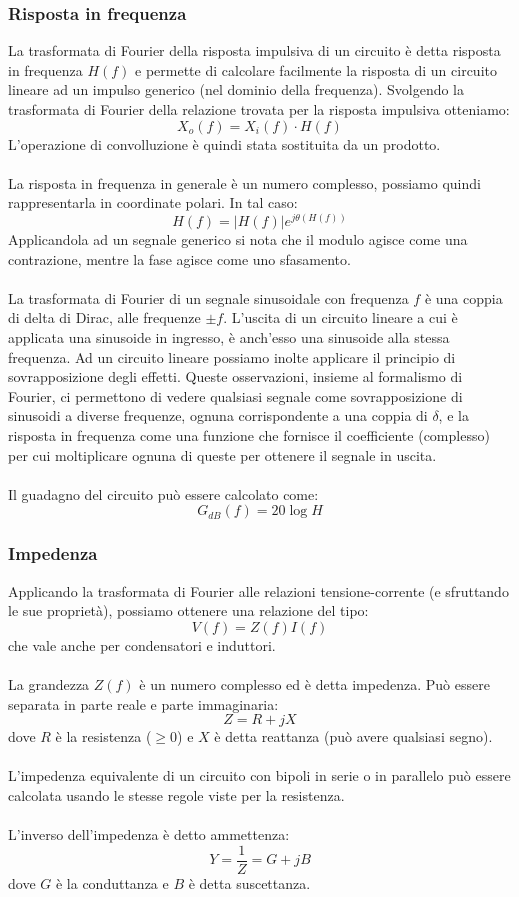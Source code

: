 \documentclass{article}
\begin{document}
\subsubsection{Risposta in frequenza}
La trasformata di Fourier della risposta impulsiva di un circuito è detta risposta in frequenza $H(f)$ e permette di calcolare facilmente la risposta di un circuito lineare ad un impulso generico (nel dominio della frequenza). Svolgendo la trasformata di Fourier della relazione trovata per la risposta impulsiva otteniamo:
$$ X_o(f) = X_i(f)\cdot H(f) $$
L'operazione di convolluzione è quindi stata sostituita da un prodotto.\\\\
La risposta in frequenza in generale è un numero complesso, possiamo quindi rappresentarla in coordinate polari. In tal caso:
$$ H(f) = |H(f)|e^{j\theta(H(f))} $$
Applicandola ad un segnale generico si nota che il modulo agisce come una contrazione, mentre la fase agisce come uno sfasamento.\\\\
La trasformata di Fourier di un segnale sinusoidale con frequenza $f$ è una coppia di delta di Dirac, alle frequenze $\pm f$. L'uscita di un circuito lineare a cui è applicata una sinusoide in ingresso, è anch'esso una sinusoide alla stessa frequenza. Ad un circuito lineare possiamo inolte applicare il principio di sovrapposizione degli effetti.
Queste osservazioni, insieme al formalismo di Fourier, ci permettono di vedere qualsiasi segnale come sovrapposizione di sinusoidi a diverse frequenze, ognuna corrispondente a una coppia di $\delta$, e la risposta in frequenza come una funzione che fornisce il coefficiente (complesso) per cui moltiplicare ognuna di queste per ottenere il segnale in uscita.\\\\
Il guadagno del circuito può essere calcolato come:
$$ G_{dB}(f)=20\log H $$

\subsubsection{Impedenza}
Applicando la trasformata di Fourier alle relazioni tensione-corrente (e sfruttando le sue proprietà), possiamo ottenere una relazione del tipo:
$$ V(f) = Z(f)I(f) $$
che vale anche per condensatori e induttori.\\\\
La grandezza $Z(f)$ è un numero complesso ed è detta impedenza. Può essere separata in parte reale e parte immaginaria:
$$ Z=R+jX $$
dove $R$ è la resistenza ($\geq0$) e $X$ è detta reattanza (può avere qualsiasi segno).\\\\
L'impedenza equivalente di un circuito con bipoli in serie o in parallelo può essere calcolata usando le stesse regole viste per la resistenza.\\\\
L'inverso dell'impedenza è detto ammettenza:
$$Y=\frac{1}{Z}=G+jB $$
dove $G$ è la conduttanza e $B$ è detta suscettanza.
\end{document}
